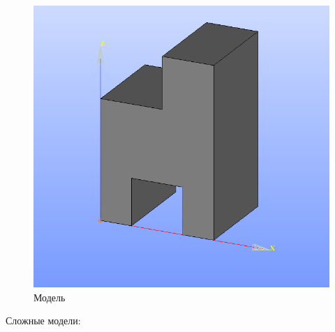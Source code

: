 \documentclass[a4paper,12pt]{article}
\theoremstyle{plain} %
\theoremstyle{definition} %
\theoremstyle{remark} %
\begin{document}
\begin{figure}[h]
\begin{center}
\begin{minipage}[h]{0.4\linewidth}
				\includegraphics[width=1\linewidth]{17.12}
				\caption{Модель}
			\end{minipage}
		\end{center}
	\end{figure}
\newpage

Сложные модели:
\end{document}
